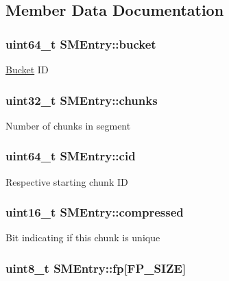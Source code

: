 \subsection{\-Member \-Data \-Documentation}
\hypertarget{structSMEntry_a3386ef7f82301b6fa487f77e69a09c80}{
\subsubsection[{bucket}]{\setlength{\rightskip}{0pt plus 5cm}uint64\-\_\-t {\bf \-S\-M\-Entry\-::bucket}}}\label{structSMEntry_a3386ef7f82301b6fa487f77e69a09c80}
\hyperlink{structBucket}{\-Bucket} \-I\-D \hypertarget{structSMEntry_af3eac3fc8f226023f2f0cbe376ce181f}{
\subsubsection[{chunks}]{\setlength{\rightskip}{0pt plus 5cm}uint32\-\_\-t {\bf \-S\-M\-Entry\-::chunks}}}\label{structSMEntry_af3eac3fc8f226023f2f0cbe376ce181f}
\-Number of chunks in segment \hypertarget{structSMEntry_ac7c9d44ce3264841482906e372b42986}{
\subsubsection[{cid}]{\setlength{\rightskip}{0pt plus 5cm}uint64\-\_\-t {\bf \-S\-M\-Entry\-::cid}}}\label{structSMEntry_ac7c9d44ce3264841482906e372b42986}
\-Respective starting chunk \-I\-D \hypertarget{structSMEntry_ad3fc577e518cee72b47bd09dc2b58530}{
\subsubsection[{compressed}]{\setlength{\rightskip}{0pt plus 5cm}uint16\-\_\-t {\bf \-S\-M\-Entry\-::compressed}}}\label{structSMEntry_ad3fc577e518cee72b47bd09dc2b58530}
\-Bit indicating if this chunk is unique \hypertarget{structSMEntry_a55d95205751f86e15965f042fcb80cde}{
\subsubsection[{fp}]{\setlength{\rightskip}{0pt plus 5cm}uint8\-\_\-t {\bf \-S\-M\-Entry\-::fp}\mbox{[}{\bf \-F\-P\-\_\-\-S\-I\-Z\-E}\mbox{]}}}\label{structSMEntry_a55d95205751f86e15965f042fcb80cde}
